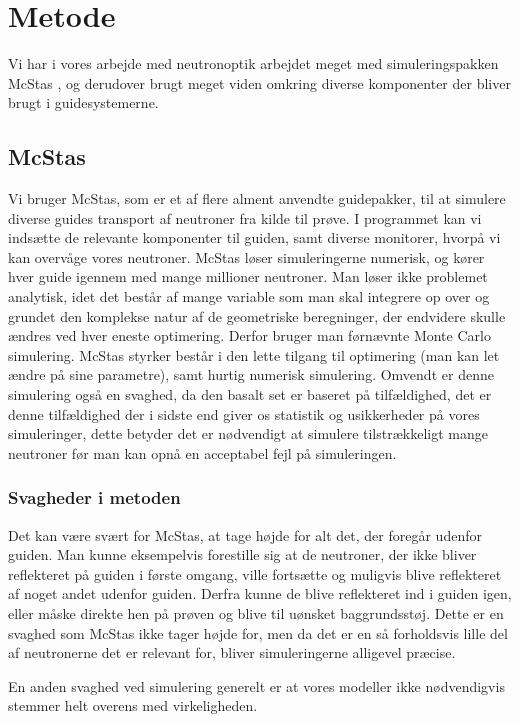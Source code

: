 \documentclass[12pt,oneside,a4paper]{article}
\begin{document}
{{{{{%
\section{Metode}
Vi har i vores arbejde med neutronoptik arbejdet meget med simuleringspakken McStas \cite{doi:10.1080/10448639908233684}, og derudover brugt meget viden omkring diverse komponenter der bliver brugt i guidesystemerne.


\subsection{McStas}
Vi bruger McStas, som er et af flere alment anvendte guidepakker, til at simulere diverse guides transport af neutroner fra kilde til prøve. I programmet kan vi indsætte de relevante komponenter til guiden, samt diverse monitorer, hvorpå vi kan overvåge vores neutroner. McStas løser simuleringerne numerisk, og kører hver guide igennem med mange millioner neutroner. Man løser ikke problemet analytisk, idet det består af mange variable som man skal integrere op over og grundet den komplekse natur af de geometriske beregninger, der endvidere skulle ændres ved hver eneste optimering. Derfor bruger man førnævnte Monte Carlo simulering. McStas styrker består i den lette tilgang til optimering (man kan let ændre på sine parametre), samt hurtig numerisk simulering. Omvendt er denne simulering også en svaghed, da den basalt set er baseret på tilfældighed, det er denne tilfældighed der i sidste end giver os statistik og usikkerheder på vores simuleringer, dette betyder det er nødvendigt at simulere tilstrækkeligt mange neutroner før man kan opnå en acceptabel fejl på simuleringen.

\subsubsection{Svagheder i metoden}
Det kan være svært for McStas, at tage højde for alt det, der foregår udenfor guiden. Man kunne eksempelvis forestille sig at de neutroner, der ikke bliver reflekteret på guiden i første omgang, ville fortsætte og muligvis blive reflekteret af noget andet udenfor guiden. Derfra kunne de blive reflekteret ind i guiden igen, eller måske direkte hen på prøven og blive til uønsket baggrundsstøj. Dette er en svaghed som McStas ikke tager højde for, men da det er en så forholdsvis lille del af neutronerne det er relevant for, bliver simuleringerne alligevel præcise.

En anden svaghed ved simulering generelt er at vores modeller ikke nødvendigvis stemmer helt overens med virkeligheden.

}}}}}
\end{document}
